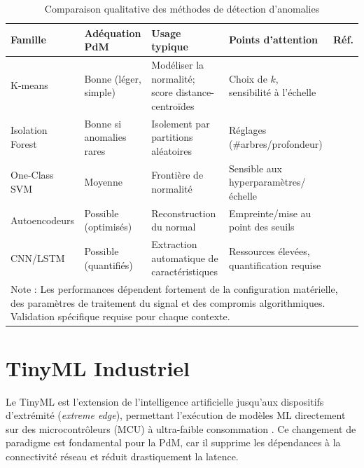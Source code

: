 \begin{table}[ht]
\centering
\caption{Comparaison qualitative des méthodes de détection d'anomalies}
\label{tab:ml_comparison}
\begin{tabular}{p{2.8cm}p{2.5cm}p{4.2cm}p{3.2cm}p{2cm}}
\toprule
\textbf{Famille} &
\textbf{Adéquation PdM} &
\textbf{Usage typique} &
\textbf{Points d'attention} &
\textbf{Réf.} \\
\midrule

K-means &
Bonne (léger, simple) &
Modéliser la normalité; score distance-centroïdes &
Choix de $k$, sensibilité à l'échelle &
\cite{macqueen1967,chandola2009} \\
\midrule

Isolation Forest &
Bonne si anomalies rares &
Isolement par partitions aléatoires &
Réglages (\#arbres/profondeur) &
\cite{chandola2009,antonini2023} \\
\midrule

One-Class SVM &
Moyenne &
Frontière de normalité &
Sensible aux hyperparamètres/échelle &
\cite{chandola2009} \\
\midrule

Autoencodeurs &
Possible (optimisés) &
Reconstruction du normal &
Empreinte/mise au point des seuils &
\cite{chandola2009,ran2019} \\
\midrule

CNN/LSTM &
Possible (quantifiés) &
Extraction automatique de caractéristiques &
Ressources élevées, quantification requise &
\cite{langer2025,arciniegas2025} \\

\bottomrule
\multicolumn{5}{p{15cm}}{\small Note : Les performances dépendent fortement de la configuration matérielle, des paramètres de traitement du signal et des compromis algorithmiques. Validation spécifique requise pour chaque contexte.} \\
\end{tabular}
\end{table}


\section{TinyML Industriel}
\label{sec:tinyml_industriel}

Le TinyML est l'extension de l'intelligence artificielle jusqu'aux dispositifs d'extrémité (\textit{extreme edge}), permettant l'exécution de modèles ML directement sur des microcontrôleurs (MCU) à ultra-faible consommation \cite{tsoukas2024,njor2024}. Ce changement de paradigme est fondamental pour la PdM, car il supprime les dépendances à la connectivité réseau et réduit drastiquement la latence.

